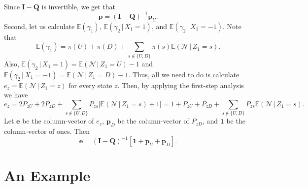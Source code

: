\documentclass{amsart}
\newcommand{\N}{{\mathcal{N}}}
\newcommand{\EE}{{\mathbb{E}}}
\newcommand{\1}{{\mathbf{1}}}
\newcommand{\gv}{\,|\,}
\begin{document}
Since $\mathbf{I}
- \mathbf{Q}$ is invertible, we get that
\begin{equation}\label{p*for*X}
\mathbf{p} = (\mathbf{I} - \mathbf{Q})^{-1} \mathbf{p}_U.
\end{equation}
Second, let us calculate $\EE(\gamma_1)$, $\EE(\gamma_2\gv X_{1}=1)$, and $\EE(\gamma_2\gv X_{1}=-1)$.
Note that
\[
  \EE(\gamma_1) = \pi(U)+\pi(D)+ \sum_{s\notin \{U,D\}} \pi(s)\EE(\N\gv Z_1=s).
\]
Also, $\EE(\gamma_2 \gv X_{1}=1) = \EE(\N\gv Z_1=U)-1$ and $\EE(\gamma_2 \gv X_{1}=-1) = \EE(\N\gv Z_1=D)-1$.
Thus, all we need to do is calculate $e_z=\EE(\N\gv Z_1=z)$ for every state $z$. Then, by applying the first-step
analysis we  have
\[
  e_z = 2P_{zU}+2P_{zD}+ \sum_{s\notin \{U,D\}} P_{zs}\big[\EE(\N\gv Z_1=s)+1\big]=1+P_{zU}+P_{zD}+ \sum_{s\notin \{U,D\}} P_{zs}\EE(\N\gv Z_1=s).
\]
Let $\mathbf{e}$ be the column-vector of $e_z$, $\mathbf{p}_D$ be
the column-vector of $P_{zD}$, and $\mathbf{1}$ be the column-vector of ones.  Then
\begin{equation}\label{e*for*gamma}
\mathbf{e} = (\mathbf{I} - \mathbf{Q})^{-1} [\mathbf{1}+\mathbf{p}_U+\mathbf{p}_D].
\end{equation}

\section{An Example}
\end{document}
